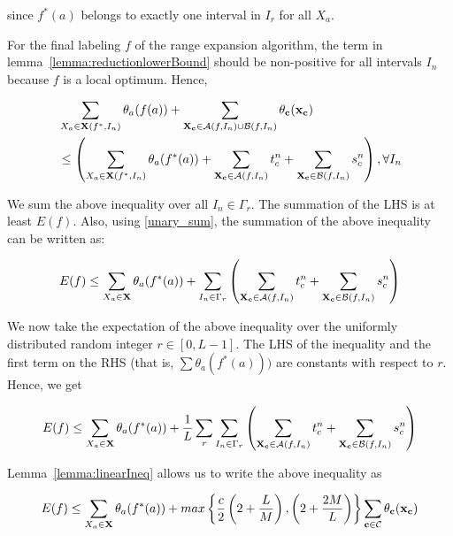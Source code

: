 \documentclass[10pt,letterpaper]{article}
\begin{document}
since $f^*(a)$ belongs to exactly one interval in $I_r$ for all $X_a$. 

For the final labeling $f$ of the range expansion algorithm, the term in lemma~\ref{lemma:reductionlowerBound} should be non-positive for all intervals $I_n$ because $f$ is a local optimum. Hence,

\begin{equation*}
	\begin{split}
		&\sum_{X_a \in {\bf X}(f^*, I_{n})} \theta_{a}(f(a)) + \sum_{{\bf X_c} \in \mathcal{A}\mathit(f, I_n) \cup \mathcal{B}\mathit(f, I_n)} \theta_{\bf c}({\bf x_c})\\
	 & \leq \left( \sum_{X_a \in {\bf X}(f^*, I_{n})} \theta_{a}(f^*(a)) + \sum_{{\bf X_c} \in \mathcal{A}\mathit(f, I_n)} t_c^n 
	 +  \sum_{{\bf X_c} \in \mathcal{B}\mathit(f, I_n)} s_c^n \right), \forall I_{n} 
	\end{split}
\end{equation*}

We sum the above inequality over all $I_n \in \Gamma_r$. The summation of the LHS is at least $E(f)$. Also, using \eqref{unary_sum}, the summation of the above inequality can be written as:

\begin{equation*}
E(f) \leq \sum_{X_a \in {\bf X}} \theta_{a}(f^*(a)) + \sum_{I_n \in \Gamma_r}\left(\sum_{{\bf X_c} \in \mathcal{A}\mathit(f, I_n)} t_c^n + \sum_{{\bf X_c} \in \mathcal{B}\mathit(f, I_n)} s_c^n \right)
\end{equation*}

We now take the expectation of the above inequality over the uniformly distributed random integer $r \in [0, L - 1]$. The LHS of the inequality and the first term on the RHS (that is, $\sum \theta_a(f^*(a)))$ are constants with respect to $r$. Hence, we get

\begin{equation}
E(f) \leq \sum_{X_a \in {\bf X}} \theta_{a}(f^*(a)) + \frac{1}{L}\sum_{r}\sum_{I_n \in \Gamma_r}\left(\sum_{{\bf X_c} \in \mathcal{A}\mathit(f, I_n)} t_c^n + \sum_{{\bf X_c} \in \mathcal{B}\mathit(f, I_n)} s_c^n \right)
\label{eq:upperboundfinalenergy}
\end{equation} 

Lemma~\ref{lemma:linearIneq} allows us to write the above inequality as 

\begin{equation}
E(f) \leq \sum_{X_a \in {\bf X}} \theta_{a}(f^*(a)) + max \left\{ \frac{c}{2}\left(2 + \frac{L}{M}\right), \left(2 + \frac{2M}{L}\right) \right\} \sum_{{\bf c} \in \mathcal{C}} \theta_{\bf c}(\bf {x_c})
\end{equation}
\end{document}
